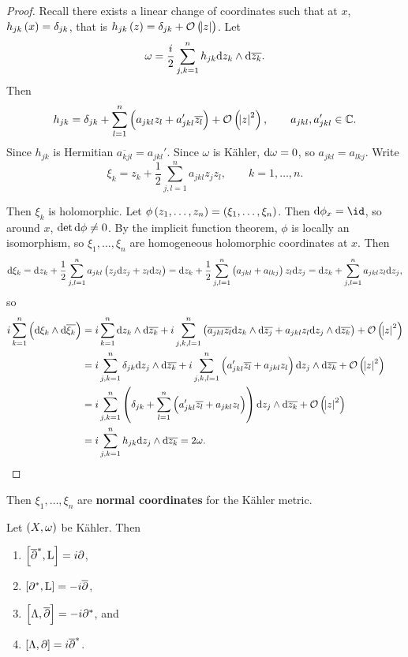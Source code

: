 \begin{proof}
Recall there exists a linear change of coordinates such that at $ x $, $ h_{jk}\br{x} = \delta_{jk} $, that is $ h_{jk}\br{z} = \delta_{jk} + \OOO\br{\abs{z}} $. Let
$$ \omega = \dfrac{i}{2}\sum_{j, k = 1}^n h_{jk}\mathrm{d} z_k \wedge \mathrm{d}\overline{z_k}. $$
Then
$$ h_{jk} = \delta_{jk} + \sum_{l = 1}^n \br{a_{jkl}z_l + a_{jkl}'\overline{z_l}} + \OOO\br{\abs{z}^2}, \qquad a_{jkl}, a_{jkl}' \in \CC. $$
Since $ h_{jk} $ is Hermitian $ \overline{a_{kjl}} = a_{jkl}' $. Since $ \omega $ is K\"ahler, $ \mathrm{d}\omega = 0 $, so $ a_{jkl} = a_{lkj} $. Write
$$ \xi_k = z_k + \dfrac{1}{2}\sum_{j, l = 1}^n a_{jkl}z_jz_l, \qquad k = 1, \dots, n. $$

\pagebreak

Then $ \xi_k $ is holomorphic. Let $ \phi\br{z_1, \dots, z_n} = \br{\xi_1, \dots, \xi_n} $. Then $ \d\phi_x = \id $, so around $ x $, $ \det \mathrm{d}\phi \ne 0 $. By the implicit function theorem, $ \phi $ is locally an isomorphism, so $ \xi_1, \dots, \xi_n $ are homogeneous holomorphic coordinates at $ x $. Then
$$ \d\xi_k = \d z_k + \dfrac{1}{2}\sum_{j, l = 1}^n a_{jkl}\br{z_j\d z_j + z_l\d z_l} = \d z_k + \dfrac{1}{2}\sum_{j, l = 1}^n \br{a_{jkl} + a_{lkj}}z_l\d z_j = \d z_k + \sum_{j, l = 1}^n a_{jkl}z_l\d z_j, $$
so
\begin{align*}
i\sum_{k = 1}^n \br{\d\xi_k \wedge \d\overline{\xi_k}}
& = i\sum_{k = 1}^n \d z_k \wedge \d\overline{z_k} + i\sum_{j, k, l = 1}^n \br{\overline{a_{jkl}z_l}\d z_k \wedge \d\overline{z_j} + a_{jkl}z_l\d z_j \wedge \d\overline{z_k}} + \OOO\br{\abs{z}^2} \\
& = i\sum_{j, k = 1}^n \delta_{jk}\d z_j \wedge \d\overline{z_k} + i\sum_{j, k, l = 1}^n \br{a_{jkl}'\overline{z_l} + a_{jkl}z_l}\d z_j \wedge \d\overline{z_k} + \OOO\br{\abs{z}^2} \\
& = i\sum_{j, k = 1}^n \br{\delta_{jk} + \sum_{l = 1}^n \br{a_{jkl}'\overline{z_l} + a_{jkl}z_l}}\d z_j \wedge \d\overline{z_k} + \OOO\br{\abs{z}^2} \\
& = i\sum_{j, k = 1}^n h_{jk}\d z_j \wedge \d\overline{z_k}
= 2\omega.
\end{align*}
\end{proof}


Then $ \xi_1, \dots, \xi_n $ are \textbf{normal coordinates} for the K\"ahler metric.

\begin{theorem}
Let $ \br{X, \omega} $ be K\"ahler. Then
\begin{enumerate}
\item $ \sbr{\dab^*, \L} = i\da $,
\item $ \sbr{\da^*, \L} = -i\dab $,
\item $ \sbr{\Lambda, \dab} = -i\da^* $, and
\item $ \sbr{\Lambda, \da} = i\dab^* $.
\end{enumerate}
\end{theorem}

